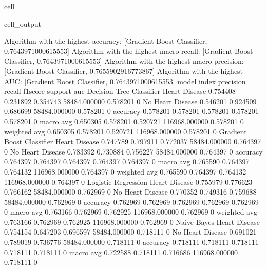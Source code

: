 \documentclass[letterpaper,10pt,english]{jupyterBook}
\begin{document}
\begin{sphinxuseclass}{cell}
\begin{sphinxVerbatimOutput}
\begin{sphinxuseclass}{cell_output}
\begin{sphinxVerbatim}[commandchars=\\\{\}]
Algorithm with the highest accuracy: [\PYGZsq{}Gradient Boost Classifier\PYGZsq{}, 0.7643971000615553]
Algorithm with the highest macro recall:
        [\PYGZsq{}Gradient Boost Classifier\PYGZsq{}, 0.7643971000615553]
Algorithm with the highest macro precision:
        [\PYGZsq{}Gradient Boost Classifier\PYGZsq{}, 0.7655902916773867]
Algorithm with the highest AUC:
        [\PYGZsq{}Gradient Boost Classifier\PYGZsq{}, 0.7643971000615553]
model                      index             precision  recall    f1\PYGZhy{}score  support        auc     
Decision Tree Classifier   Heart Disease     0.754408   0.231892  0.354743  58484.000000   0.578201    0
                           No Heart Disease  0.546201   0.924509  0.686699  58484.000000   0.578201    0
                           accuracy          0.578201   0.578201  0.578201  0.578201       0.578201    0
                           macro avg         0.650305   0.578201  0.520721  116968.000000  0.578201    0
                           weighted avg      0.650305   0.578201  0.520721  116968.000000  0.578201    0
Gradient Boost Classifier  Heart Disease     0.747789   0.797911  0.772037  58484.000000   0.764397    0
                           No Heart Disease  0.783392   0.730884  0.756227  58484.000000   0.764397    0
                           accuracy          0.764397   0.764397  0.764397  0.764397       0.764397    0
                           macro avg         0.765590   0.764397  0.764132  116968.000000  0.764397    0
                           weighted avg      0.765590   0.764397  0.764132  116968.000000  0.764397    0
Logistic Regression        Heart Disease     0.755979   0.776623  0.766162  58484.000000   0.762969    0
                           No Heart Disease  0.770352   0.749316  0.759688  58484.000000   0.762969    0
                           accuracy          0.762969   0.762969  0.762969  0.762969       0.762969    0
                           macro avg         0.763166   0.762969  0.762925  116968.000000  0.762969    0
                           weighted avg      0.763166   0.762969  0.762925  116968.000000  0.762969    0
Naive Bayes                Heart Disease     0.754154   0.647203  0.696597  58484.000000   0.718111    0
                           No Heart Disease  0.691021   0.789019  0.736776  58484.000000   0.718111    0
                           accuracy          0.718111   0.718111  0.718111  0.718111       0.718111    0
                           macro avg         0.722588   0.718111  0.716686  116968.000000  0.718111    0

\end{sphinxVerbatim}
\end{sphinxuseclass}
\end{sphinxVerbatimOutput}
\end{sphinxuseclass}
\end{document}
